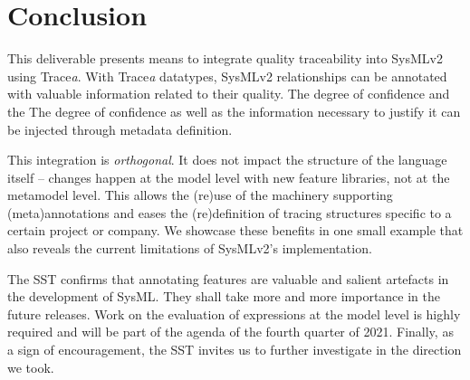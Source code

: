 \section{Conclusion}\label{sec:conclusion}

This deliverable presents means to integrate quality traceability into SysMLv2 using Trace\textit{a}.
With Trace\textit{a} datatypes, SysMLv2 relationships can be annotated with valuable information related to their quality. The degree of confidence and the
The degree of confidence as well as the information necessary to justify it can be injected through metadata definition.


This integration is \textit{orthogonal}. It does not impact the structure of the language itself -- changes happen at the model level with new feature libraries, not at the metamodel level.
This allows the (re)use of the machinery supporting (meta)annotations and eases the (re)definition of tracing structures specific to a certain project or company. We showcase these benefits in one small example that also reveals the current limitations of SysMLv2's implementation.

The SST confirms that annotating features are valuable and salient artefacts in the development of SysML. They shall take more and more importance in the future releases. Work on the evaluation of expressions at the model level is highly required and will be part of the agenda of the fourth quarter of 2021. 
Finally, as a sign of encouragement, the SST invites us to further investigate in the direction we took. 
